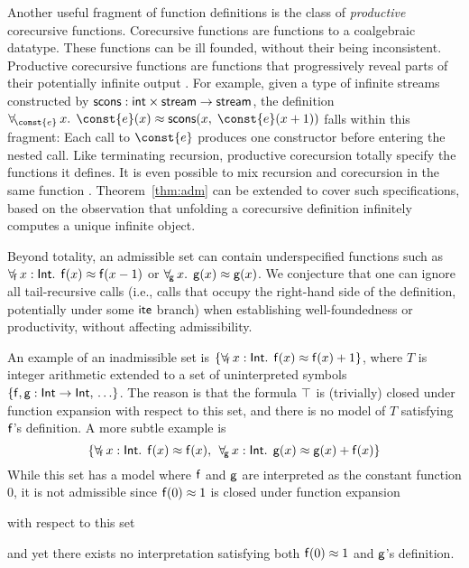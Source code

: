 Another useful fragment of function definitions is the class of
\emph{productive} corecursive functions. Corecursive functions are functions to
a coalgebraic datatype. These functions can be ill founded, without
their being inconsistent. Productive corecursive functions are functions that
progressively reveal parts of their potentially infinite
output \cite{turner-1995,mcbride-productive}.
For example, given a type of infinite streams constructed by
$\mathsf{scons} : \mathsf{int} \times \mathsf{stream} \to \mathsf{stream}$,
the definition
$\forallf{\const{e}} x.\;\, \const{e}(x) \teq \con{scons}(x,\; \const{e}(x + 1))$
falls within this fragment: Each call to $\const{e}$ produces one
constructor before entering the nested call. Like terminating recursion,
productive corecursion totally specify the functions it defines.
It is even possible to mix recursion and corecursion in the same function
\cite{blanchette-et-al-2015-fouco}. Theorem~\ref{thm:adm} can be extended to
cover such specifications, based on the observation that unfolding
a corecursive definition infinitely computes a unique infinite object.

\begin{rep}
Beyond totality, an admissible set can contain underspecified functions
such as $\forall_{\!\mathsf{f}\:} x : \mathsf{Int}.\allowbreak\;\, \mathsf{f}( x )
\approx \mathsf{f}( x - 1 )$ or $\forall_{\!\mathsf{g}\:} x.\allowbreak\;\, \mathsf{g}( x
) \approx \mathsf{g}( x )$. We conjecture that one can ignore all
tail-recursive calls (i.e., calls that occupy the right-hand side of the
definition, potentially under some $\mathsf{ite}$ branch) when establishing well-foundedness
or productivity, without affecting admissibility.
\end{rep}

\newcommand\badassex{
 \{\forallf{\con{f}} x : \typeint.\;\, \con{f}( x ) \teq \con{f}( x ),\allowbreak\;\,
 \forallf{\con{g}} x : \typeint.\;\, \con{g}( x ) \teq \con{g}( x ) + \nobreak\con{f}( x )\}}

An example of an inadmissible set is
$\{ \forall_{\!\mathsf{f}\:} x : \mathsf{Int}.\;\, \mathsf{f}( x ) \approx \mathsf{f}( x ) + 1 \}$,
where $T$ is integer arithmetic extended to a set of uninterpreted symbols 
$\{\mathsf{f}, \mathsf{g} :\mathsf{Int} \rightarrow \mathsf{Int},\, \ldots \}$.
The reason is that the formula $\top$ is (trivially) closed under function expansion with respect to this set,
and there is no model of $T$
satisfying $\mathsf{f}$'s definition. A more subtle example is
\[\badassex\]
While this set has a model where $\mathsf{f}$ and $\mathsf{g}$ are interpreted as the
constant function $0$, it is not admissible since %
$\mathsf{f}( 0 ) \approx 1$ is
closed under function expansion \begin{rep}with respect to this set\end{rep}
and yet there exists
no interpretation satisfying both $\mathsf{f}( 0 ) \approx 1$ and $\mathsf{g}$'s
definition.

